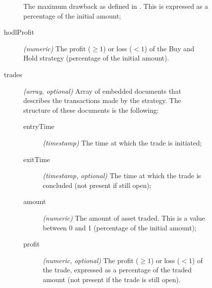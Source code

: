 \begin{description}
\begin{description}
\begin{description}
						The maximum drawback as defined
						in . This is
						expressed as a percentage of the
						initial amount;
					\item[hodlProfit] \textit{(numeric)}
						The profit (\(\ge 1\)) or
						loss (\(< 1\)) of the Buy and
						Hold strategy (percentage of the
						initial amount).
					\item[trades] \textit{(array, optional)}
						Array of embedded documents that
						describes the transactions made
						by the strategy. The structure
						of these documents is the
						following:
						\begin{description}
							\item[entryTime]
								\textit{(timestamp)}
								The time at
								which the trade
								is initiated;
							\item[exitTime]
								\textit{(timestamp,
								optional)}
								The time at
								which the trade
								is concluded
								(not present if
								still open);
							\item[amount]
								\textit{(numeric)}
								The amount of
								asset traded.
								This is a value
								between 0 and 1
								(percentage of
								the initial
								amount);
							\item[profit]
								\textit{(numeric,
								optional)} The
								profit (\(\ge
								1\)) or loss
								(\(< 1\)) of the
								trade, expressed
								as a percentage
								of the traded
								amount (not
								present if the
								trade is still
								open).
						\end{description}
				\end{description}
		\end{description}
\end{description}

